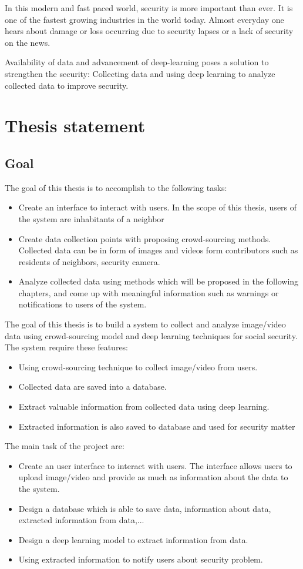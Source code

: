 In this modern and fast paced world, security is more important than ever. It is one of the fastest growing industries in the world today.
Almost everyday one hears about damage or loss occurring due to security lapses or a lack of security on the news. 

Availability of data and advancement of deep-learning poses a solution to strengthen the security: Collecting data and using deep learning to analyze collected data to improve security. 
 
\section{Thesis statement}
\subsection{Goal}
The goal of this thesis is to accomplish to the following tasks:
\begin{itemize}
	\item Create an interface to interact with users. In the scope of this thesis, users of the system are inhabitants of a neighbor
	\item Create data collection points with proposing crowd-sourcing methods. Collected data can be in form of images and videos form contributors such as residents of neighbors, security camera.
	\item Analyze collected data using methods which will be proposed in the following chapters, and come up with meaningful information such as warnings or notifications to users of the system.
\end{itemize} 

The goal of this thesis is to build a system to collect and analyze image/video data using crowd-sourcing model and deep learning techniques for social security. The system require these features:
\begin{itemize}
	\item Using crowd-sourcing technique to collect image/video from users.
	\item Collected data are saved into a database.
	\item Extract valuable information from collected data using deep learning.
	\item Extracted information is also saved to database and used for security matter
\end{itemize} 
The main task of the project are:
\begin{itemize}
	\item Create an user interface to interact with users. The interface allows users to upload image/video and provide as much as information about the data to the system.
	\item Design a database which is able to save data, information about data, extracted information from data,...
	\item Design a deep learning model to extract information from data.
	\item Using extracted information to notify users about security problem.
\end{itemize} 

